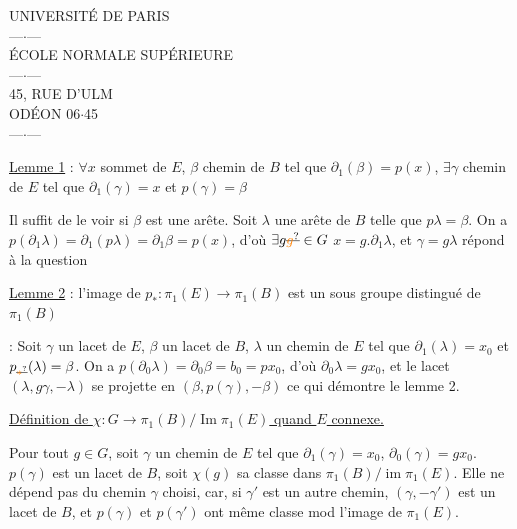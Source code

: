 

\begin{center}
UNIVERSITÉ DE PARIS\\
---$\cdot$---\\
ÉCOLE NORMALE SUPÉRIEURE\\
---$\cdot$---\\
45, RUE D'ULM\\
ODÉON 06$\cdot$45\\
---$\cdot$---
\end{center}


\uline{Lemme 1} : $\forall x$ sommet de $E$, $\beta$ chemin de $B$ tel que $\partial_1(\beta)=p(x)$, $\exists\gamma$ chemin de $E$ tel que $\partial_1(\gamma)=x$ et $p(\gamma)=\beta$

 Il suffit de le voir si $\beta$ est une arête. Soit $\lambda$ une arête de $B$ telle que $p\lambda=\beta$. On a \deleted{$\unsure{\partial}$} $p(\partial_1\lambda)=\partial_1(p\lambda)=\partial_1\beta=p(x)$, d'où $\exists g\deleted{\unsure{g}}\in G$ $x=g.\partial_1\lambda$, et $\gamma=g\lambda$ répond à la question

\uline{Lemme 2} : l'image de $p_*:\pi_1(E)\to\pi_1(B)$ est un sous groupe distingué de $\pi_1(B)$

 : Soit $\gamma$ un lacet de  $E$, $\beta$ un lacet de $B$, $\lambda$ un chemin de $E$ tel que $\partial_1(\lambda)=x_0$ et $p_{\deleted{\unsure{*}}}(\lambda)=\beta$. On a $p(\partial_0\lambda)=\partial_0\beta=b_0=px_0$, d'où $\partial_0\lambda=gx_0$, et le lacet $(\lambda,g\gamma,-\lambda)$ se projette en $(\beta,p(\gamma),-\beta)$ ce qui démontre le lemme 2.

\uline{Définition de $\chi:G\longrightarrow\pi_1(B)/\operatorname{Im}\pi_1(E)$ quand $E$ connexe.}

Pour tout $g\in G$, soit $\gamma$ un chemin de $E$ tel que $\partial_1(\gamma)=x_0$, $\partial_0(\gamma)=gx_0$.  $p(\gamma)$ est un lacet de $B$, soit $\chi(g)$ sa classe dans $\pi_1(B)/\operatorname{im}\pi_1(E)$. Elle ne dépend pas du chemin $\gamma$ choisi, car, si $\gamma'$ est un autre chemin, $(\gamma,-\gamma')$ est un lacet de $B$, et  $p(\gamma)$ et $p(\gamma')$ ont même classe mod l'image de $\pi_1(E)$.

